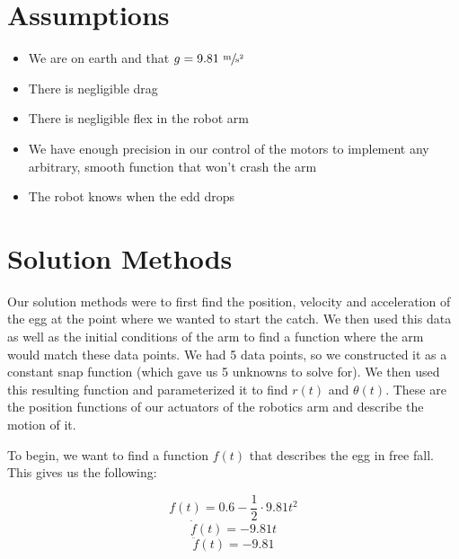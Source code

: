 \documentclass[nofoot,pdf-a,balance,colorlinks,upint,subscriptcorrection,varvw,mathalfa=cal=boondoxo]{asmeconf}
\begin{document}
		\section*{Assumptions}
	
	\begin{itemize}
        \item We are on earth and that $g = 9.81 \textrm{ }\sfrac{\textrm{m}}{\textrm{s}^2}$
		\item There is negligible drag
		\item There is negligible flex in the robot arm
        \item We have enough precision in our control of the motors to implement any arbitrary, smooth function that won't crash the arm
		\item The robot knows when the edd drops
	\end{itemize}

	\section*{Solution Methods}
	
		Our solution methods were to first find the position, velocity and acceleration of the egg at the point where we wanted to start the catch. We then used this data as well as the initial conditions of the arm to find a function where the arm would match these data points. We had 5 data points, so we constructed it as a constant snap function (which gave us 5 unknowns to solve for). We then used this resulting function and parameterized it to find $r\left(t\right)$ and $\theta\left(t\right)$. These are the position functions of our actuators of the robotics arm and describe the motion of it.\newline

        To begin, we want to find a function $f\left(t\right)$ that describes the egg in free fall. This gives us the following:

        \begin{equation}
            f\left(t\right) = 0.6 - \frac{1}{2} \cdot 9.81 t^2
        \end{equation}
        \begin{equation}
            \dot{f}\left(t\right) = - 9.81 t
        \end{equation}
        \begin{equation}
            \ddot{f}\left(t\right) = - 9.81
        \end{equation}
\end{document}

